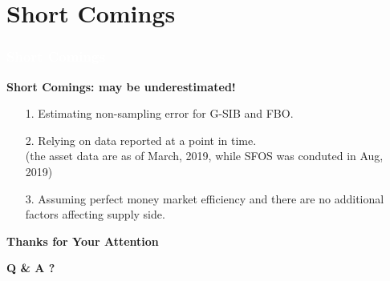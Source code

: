 \documentclass{beamer}	%
\theoremstyle{plain}
\theoremstyle{definition}
\theoremstyle{remark}
\numberwithin{equation}{section}
\begin{document}
\section{Short Comings}
\begin{frame}
\frametitle{\textcolor{white}{Short Comings}}

\small
\textbf{Short Comings: may be underestimated!}
\begin{itemize}
\item[1.] Estimating non-sampling error for G-SIB and FBO.
\item[2.] Relying on data reported at a point in time.\\
(the asset data are as of March, 2019, while SFOS was conduted in Aug, 2019)
\item[3.] Assuming perfect money market efficiency and there are no additional factors affecting supply side.
\end{itemize}

\end{frame}


\begin{frame}
\begin{center} {\bfseries \Large Thanks for Your Attention} \end{center}
\vbox{}
\begin{center} {\bfseries \Large Q \& A ?} \end{center}
\end{frame}
\end{document}
